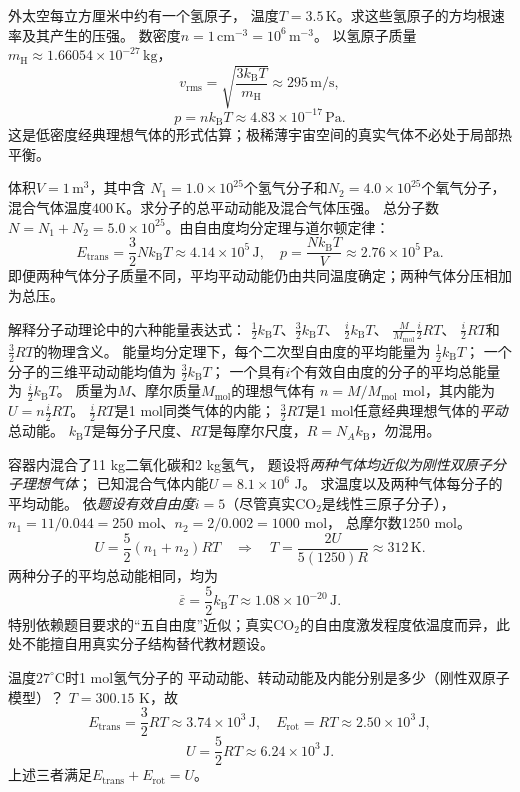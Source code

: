 \problemtext 外太空每立方厘米中约有一个氢原子，
温度$T=3.5\,\mathrm K$。求这些氢原子的方均根速率及其产生的压强。
\workings
数密度$n=1\,\mathrm{cm^{-3}}=10^6\,\mathrm{m^{-3}}$。
以氢原子质量$m_{\mathrm H}\approx1.66054\times10^{-27}\,\mathrm{kg}$，
\[
\boxed{v_{\mathrm{rms}}
=\sqrt{\frac{3k_{\mathrm B}T}{m_{\mathrm H}}}
\approx295\,\mathrm{m/s}},
\]
\[
\boxed{p=nk_{\mathrm B}T\approx4.83\times10^{-17}\,\mathrm{Pa}}.
\]
\crosscheck 这是低密度经典理想气体的形式估算；极稀薄宇宙空间的真实气体不必处于局部热平衡。

\problemtext 体积$V=1\,\mathrm{m^3}$，其中含
$N_1=1.0\times10^{25}$个氢气分子和$N_2=4.0\times10^{25}$个氧气分子，
混合气体温度$400\,\mathrm K$。求分子的总平动动能及混合气体压强。
\workings
总分子数$N=N_1+N_2=5.0\times10^{25}$。由自由度均分定理与道尔顿定律：
\[
\boxed{E_{\mathrm{trans}}=\frac32Nk_{\mathrm B}T
\approx4.14\times10^5\,\mathrm J},
\quad
\boxed{p=\frac{Nk_{\mathrm B}T}{V}
\approx2.76\times10^5\,\mathrm{Pa}}.
\]
\crosscheck 即便两种气体分子质量不同，平均平动动能仍由共同温度确定；两种气体分压相加为总压。

\problemtext 解释分子动理论中的六种能量表达式：
$\frac12k_{\mathrm B}T$、$\frac32k_{\mathrm B}T$、
$\frac i2k_{\mathrm B}T$、
$\frac{M}{M_{\mathrm{mol}}}\frac i2RT$、
$\frac i2RT$和$\frac32RT$的物理含义。
\workings
能量均分定理下，每个二次型自由度的平均能量为
$\boxed{\frac12k_{\mathrm B}T}$；
一个分子的三维平动动能均值为
$\boxed{\frac32k_{\mathrm B}T}$；
一个具有$i$个有效自由度的分子的平均总能量为
$\boxed{\frac i2k_{\mathrm B}T}$。
质量为$M$、摩尔质量$M_{\mathrm{mol}}$的理想气体有
$n=M/M_{\mathrm{mol}}$ mol，其内能为
$\boxed{U=n\frac i2RT}$。
$\frac i2RT$是1 mol同类气体的内能；
$\frac32RT$是1 mol任意经典理想气体的\emph{平动}总动能。
\crosscheck $k_{\mathrm B}T$是每分子尺度、$RT$是每摩尔尺度，$R=N_Ak_{\mathrm B}$，勿混用。

\problemtext 容器内混合了11 kg二氧化碳和2 kg氢气，
题设将\emph{两种气体均近似为刚性双原子分子理想气体}；
已知混合气体内能$U=8.1\times10^6$ J。
求温度以及两种气体每分子的平均动能。
\workings
依\emph{题设有效自由度$i=5$}（尽管真实CO$_2$是线性三原子分子），
$n_1=11/0.044=250$ mol、$n_2=2/0.002=1000$ mol，
总摩尔数1250 mol。
\[
U=\frac52(n_1+n_2)RT
\quad\Longrightarrow\quad
\boxed{T=\frac{2U}{5(1250)R}\approx312\,\mathrm K}.
\]
两种分子的平均总动能相同，均为
\[
\boxed{\overline\varepsilon
=\frac52k_{\mathrm B}T\approx1.08\times10^{-20}\,\mathrm J}.
\]
\crosscheck 特别依赖题目要求的“五自由度”近似；真实CO$_2$的自由度激发程度依温度而异，此处不能擅自用真实分子结构替代教材题设。

\problemtext 温度$27^\circ\mathrm C$时1 mol氢气分子的
平动动能、转动动能及内能分别是多少（刚性双原子模型）？
\workings
$T=300.15$ K，故
\[
\boxed{E_{\mathrm{trans}}=\frac32RT\approx3.74\times10^3\,\mathrm J},
\quad
\boxed{E_{\mathrm{rot}}=RT\approx2.50\times10^3\,\mathrm J},
\]
\[
\boxed{U=\frac52RT\approx6.24\times10^3\,\mathrm J}.
\]
\crosscheck 上述三者满足$E_{\mathrm{trans}}+E_{\mathrm{rot}}=U$。
